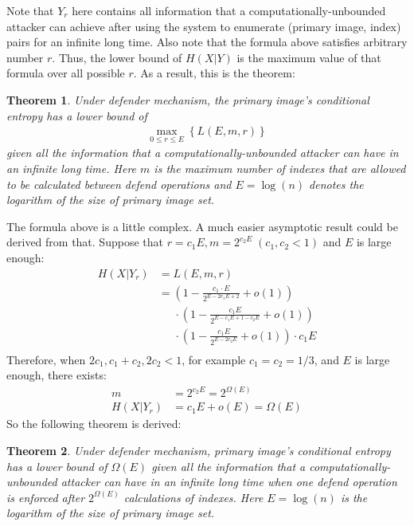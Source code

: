 \documentclass[10pt, conference, compsocconf]{IEEEtran}
\newtheorem{mytheorem}{Theorem}
\begin{document}
        Note that $Y_r$ here contains all
        information that a computationally-unbounded
        attacker can achieve after
        using the system to enumerate (primary image, index) pairs
        for an infinite long time. Also note that the formula above
        satisfies arbitrary number $r$. Thus, the lower bound
        of $H(X | Y)$ is the maximum value of that formula
        over all possible $r$.
        As a result, this is the theorem:
        \begin{mytheorem}\label{thm1}
            Under defender mechanism,
            the primary image's conditional entropy has a lower bound of
            \begin{align*}
                \max_{0 \leq r \leq E} \left\{ L(E, m, r) \right\}
            \end{align*}
            given all the information
            that a computationally-unbounded attacker can
            have in an infinite long time. Here $m$ is
            the maximum number of indexes that are allowed to be calculated
            between defend operations and $E = \log(n)$ denotes the
            logarithm of the size of primary image set.
        \end{mytheorem}

        The formula above is a little complex. A much easier asymptotic result
        could be derived from that. Suppose that
        $r = c_1 E, m = 2^{c_2 E} \; (c_1, c_2 < 1)$ and $E$ is large enough:
        \begin{align*}
            H(X | Y_r) &= L(E, m, r)\\
                        &= \left(1-\frac{c_1 \cdot E}{ 2^{E-2 c_1 E+2} } + o(1) \right)\\
                            &\;\;\;\;\; \cdot \left(1-\frac{c_1 E}{2^{E-c_1 E+1 - c_2 E}} + o(1) \right)\\
                            &\;\;\;\;\; \cdot \left(1-\frac{c_1 E}{2^{E-2 c_2 E}} + o(1) \right) \cdot c_1 E\\
        \end{align*}
        Therefore, when $2c_1, c_1+c_2, 2c_2 < 1$, for example $c_1 = c_2 = 1/3$,
        and $E$ is large enough, there exists:
        \begin{align*}
            m &= 2^{c_2 E} = 2^{\Omega(E)}\\
            H(X | Y_r) &= c_1E+o(E) = \Omega(E)
        \end{align*}
        So the following theorem is derived:
        \begin{mytheorem}
            Under defender mechanism,
            primary image's conditional entropy has a lower bound of $\Omega(E)$
            given all the information
            that a computationally-unbounded attacker can
            have in an infinite long time when one defend operation
            is enforced after $2^{\Omega(E)}$ calculations of indexes.
            Here $E = \log(n)$ is the
            logarithm of the size of primary image set.
        \end{mytheorem}
\end{document}
